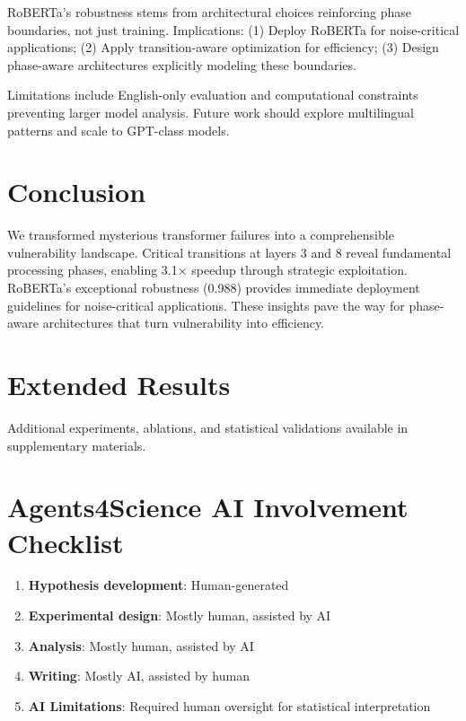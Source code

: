 \documentclass{article}
\begin{document}
RoBERTa's robustness stems from architectural choices reinforcing phase boundaries, not just training. Implications: (1) Deploy RoBERTa for noise-critical applications; (2) Apply transition-aware optimization for efficiency; (3) Design phase-aware architectures explicitly modeling these boundaries.

Limitations include English-only evaluation and computational constraints preventing larger model analysis. Future work should explore multilingual patterns and scale to GPT-class models.

\section{Conclusion}

We transformed mysterious transformer failures into a comprehensible vulnerability landscape. Critical transitions at layers 3 and 8 reveal fundamental processing phases, enabling 3.1× speedup through strategic exploitation. RoBERTa's exceptional robustness (0.988) provides immediate deployment guidelines for noise-critical applications. These insights pave the way for phase-aware architectures that turn vulnerability into efficiency.




\appendix

\section{Extended Results}
Additional experiments, ablations, and statistical validations available in supplementary materials.

\newpage
\section*{Agents4Science AI Involvement Checklist}
\begin{enumerate}
\item \textbf{Hypothesis development}: Human-generated
\item \textbf{Experimental design}: Mostly human, assisted by AI
\item \textbf{Analysis}: Mostly human, assisted by AI
\item \textbf{Writing}: Mostly AI, assisted by human
\item \textbf{AI Limitations}: Required human oversight for statistical interpretation
\end{enumerate}
\end{document}
